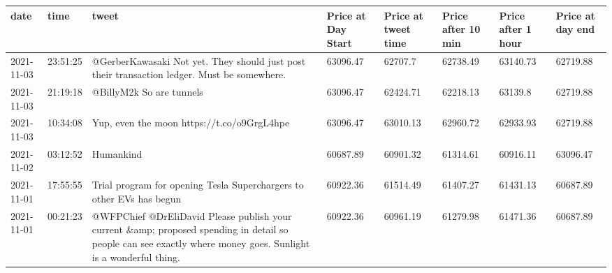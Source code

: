 \begin{tabular}{llllllll}
\toprule
      date &     time &                                                                                                                                                            tweet & Price at Day Start & Price at tweet time & Price after 10 min & Price after 1 hour & Price at day end \\
\midrule
2021-11-03 & 23:51:25 &                                                                      @GerberKawasaki Not yet. They should just post their transaction ledger. Must be somewhere. &           63096.47 &             62707.7 &           62738.49 &           63140.73 &         62719.88 \\
2021-11-03 & 21:19:18 &                                                                                                                                         @BillyM2k So are tunnels &           63096.47 &            62424.71 &           62218.13 &            63139.8 &         62719.88 \\
2021-11-03 & 10:34:08 &                                                                                                                      Yup, even the moon  https://t.co/o9GrgL4hpe &           63096.47 &            63010.13 &           62960.72 &           62933.93 &         62719.88 \\
2021-11-02 & 03:12:52 &                                                                                                                                Humankind     &           60687.89 &            60901.32 &           61314.61 &           60916.11 &         63096.47 \\
2021-11-01 & 17:55:55 &                                                                                             Trial program for opening Tesla Superchargers to other EVs has begun &           60922.36 &            61514.49 &           61407.27 &           61431.13 &         60687.89 \\
2021-11-01 & 00:21:23 & @WFPChief @DrEliDavid Please publish your current \&amp; proposed spending in detail so people can see exactly where money goes.   Sunlight is a wonderful thing. &           60922.36 &            60961.19 &           61279.98 &           61471.36 &         60687.89 \\
\bottomrule
\end{tabular}
